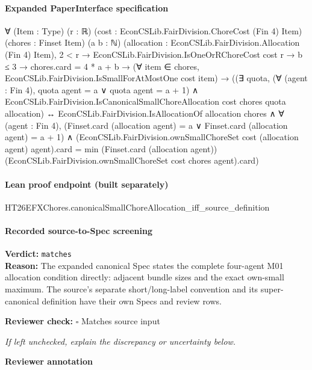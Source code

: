 \documentclass[10pt]{article}
\newcommand{\reviewerbox}{%
  \par\noindent\fbox{\parbox{0.96\linewidth}{\rule{0pt}{0.38in}}}\par
}
\newcommand{\reviewmatch}[1]{%
  \par\noindent\textbf{Reviewer check:} $\square$\; #1\par
  \noindent\emph{If left unchecked, explain the discrepancy or uncertainty below.}\par
}
\begin{document}
\paragraph{Expanded PaperInterface specification}
\begin{ReviewVerbatim}
∀ (Item : Type) (r : ℝ) (cost : EconCSLib.FairDivision.ChoreCost (Fin 4) Item) (chores : Finset Item) (a b : ℕ)
  (allocation : EconCSLib.FairDivision.Allocation (Fin 4) Item),
  2 < r →
    EconCSLib.FairDivision.IsOneOrRChoreCost cost r →
      b ≤ 3 →
        chores.card = 4 * a + b →
          (∀ item ∈ chores, EconCSLib.FairDivision.IsSmallForAtMostOne cost item) →
            ((∃ quota,
                (∀ (agent : Fin 4), quota agent = a ∨ quota agent = a + 1) ∧
                  EconCSLib.FairDivision.IsCanonicalSmallChoreAllocation cost chores quota allocation) ↔
              EconCSLib.FairDivision.IsAllocationOf allocation chores ∧
                ∀ (agent : Fin 4),
                  (Finset.card (allocation agent) = a ∨ Finset.card (allocation agent) = a + 1) ∧
                    (EconCSLib.FairDivision.ownSmallChoreSet cost (allocation agent) agent).card =
                      min (Finset.card (allocation agent))
                        (EconCSLib.FairDivision.ownSmallChoreSet cost chores agent).card)
\end{ReviewVerbatim}

\paragraph{Lean proof endpoint (built separately)}\begin{ReviewVerbatim}
HT26EFXChores.canonicalSmallChoreAllocation_iff_source_definition
\end{ReviewVerbatim}

\paragraph{Recorded source-to-Spec screening}
\textbf{Verdict:} \texttt{matches}
\\
\textbf{Reason:} The expanded canonical Spec states the complete four-agent M01 allocation condition directly: adjacent bundle sizes and the exact own-small maximum. The source's separate short/long-label convention and its super-canonical definition have their own Specs and review rows.
\reviewmatch{Matches source input}
\noindent\textbf{Reviewer annotation}\par
\reviewerbox
\clearpage
\hypertarget{source-claim-1250d6810504d818}{}
\end{document}
